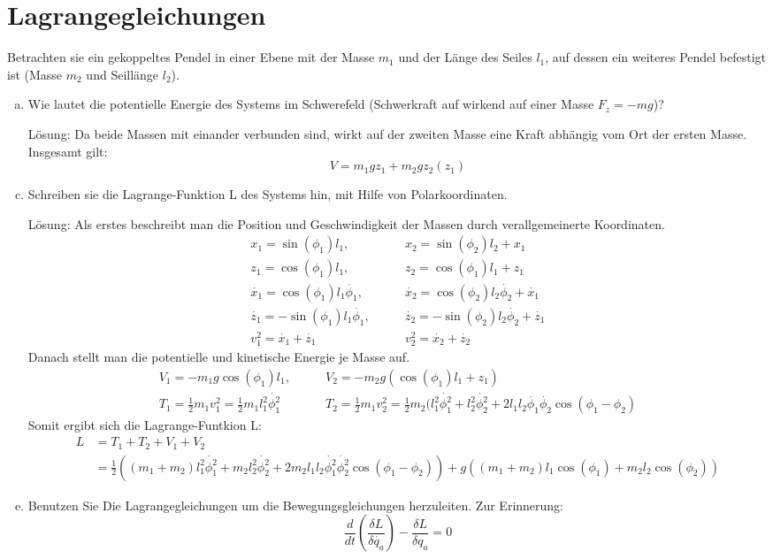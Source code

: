 \documentclass{scrartcl}
\begin{document}
\section{Lagrangegleichungen}

Betrachten sie ein gekoppeltes Pendel in einer Ebene mit der Masse $m_1$ und der Länge des Seiles $l_1$, auf dessen ein weiteres Pendel befestigt ist (Masse $m_2$ und Seillänge $l_2$).

\begin{enumerate}[a)]
\item Wie lautet die potentielle Energie des Systems im Schwerefeld (Schwerkraft auf wirkend auf einer Masse $F_z = -mg$)?

\item[Lösung:]
Da beide Massen mit einander verbunden sind, wirkt auf der zweiten Masse eine Kraft abhängig vom Ort der ersten Masse. Insgesamt gilt:
\[V = m_1gz_1 + m_2gz_2(z_1)\]


\item Schreiben sie die Lagrange-Funktion L des Systems hin, mit Hilfe von Polarkoordinaten.

\item[Lösung:]
Als erstes beschreibt man die Position und Geschwindigkeit der Massen durch verallgemeinerte Koordinaten.
\begin{align*}
x_1 = \sin(\phi_1) l_1, \qquad& x_2 = \sin(\phi_2) l_2 + x_1 \\
z_1 = \cos(\phi_1) l_1, \qquad& z_2 = \cos(\phi_1) l_1 + z_1
\\
\dot{x_1} = \cos(\phi_1) l_1 \dot{\phi_1}, \qquad& 
\dot{x_2} =  \cos(\phi_2) l_2 \dot{\phi_2} + \dot{x_1} \\
\dot{z_1} = -\sin(\phi_1) l_1 \dot{\phi_1}, \qquad& 
\dot{z_2} = -\sin(\phi_2) l_2 \dot{\phi_2} + \dot{z_1} \\
v_1^2 = \dot{x_1} + \dot{z_1} \qquad& v_2^2 = \dot{x_2} + \dot{z_2}
\end{align*}
Danach stellt man die potentielle und kinetische Energie je Masse auf.
\begin{align*}
V_1 = -m_1g \cos(\phi_1) l_1, \qquad& 
V_2 = -m_2g(\cos(\phi_1) l_1 + z_1) \\
T_1 = \frac{1}{2} m_1 v_1^2 = \frac{1}{2} m_1 l_1^2 \dot{\phi_1^2} \qquad&
T_2 = \frac{1}{2} m_1 v_2^2 = \frac{1}{2} m_2 (l_1^2\dot{\phi_1^2} + l_2^2\dot{\phi_2^2} + 2l_1l_2\dot{\phi_1}\dot{\phi_2}\cos(\phi_1 - \phi_2)
\end{align*}
Somit ergibt sich die Lagrange-Funtkion L:
\begin{align*}
L &= T_1 + T_2 + V_1 + V_2\\
&= \frac{1}{2}((m_1 + m_2)l_1^2\dot{\phi_1^2} + m_2l_2^2\dot{\phi_2^2} + 2m_2l_1l_2\dot{\phi_1^2}\dot{\phi_2^2}\cos(\phi_1 - \phi_2)) + g((m_1 + m_2)l_1\cos(\phi_1) + m_2l_2\cos(\phi_2))
\end{align*}
\item Benutzen Sie Die Lagrangegleichungen um die Bewegungsgleichungen herzuleiten. Zur Erinnerung:
\[\frac{d}{dt}(\frac{\delta L}{\delta\dot{q_a}}) - \frac{\delta L}{\delta q_a} = 0\]


\end{enumerate}
\end{document}
